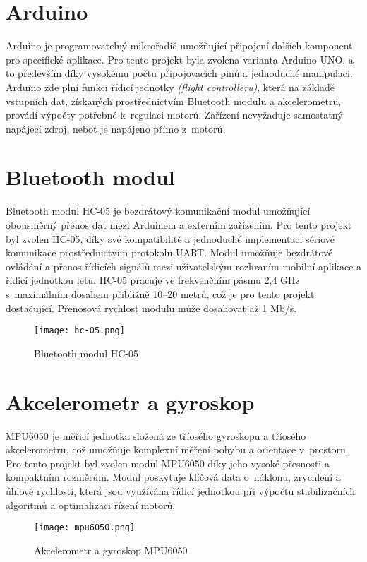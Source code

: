 \documentclass[12pt]{report}
\begin{document}
\section[Arduino]{Arduino}
Arduino je programovatelný mikrořadič umožňující připojení dalších komponent pro specifické aplikace. Pro tento projekt byla zvolena varianta Arduino UNO, a to především díky vysokému počtu připojovacích pinů a jednoduché manipulaci. Arduino zde plní funkci řídicí jednotky \textit{(flight controlleru)}, která na základě vstupních dat, získaných prostřednictvím Bluetooth modulu a akcelerometru, provádí výpočty potřebné k~regulaci motorů. Zařízení nevyžaduje samostatný napájecí zdroj, neboť je napájeno přímo z~motorů.

\section[Bluetooth modul]{Bluetooth modul}
Bluetooth modul HC-05 je bezdrátový komunikační modul umožňující obousměrný přenos dat mezi Arduinem a externím zařízením. Pro tento projekt byl zvolen HC-05, díky své kompatibilitě a jednoduché implementaci sériové komunikace prostřednictvím protokolu UART. Modul umožňuje bezdrátové ovládání a přenos řídicích signálů mezi uživatelským rozhraním mobilní aplikace a řídicí jednotkou letu. HC-05 pracuje ve frekvenčním pásmu 2,4 GHz s~maximálním dosahem přibližně 10–20 metrů, což je pro tento projekt dostačující. Přenosová rychlost modulu může dosahovat až 1 Mb/s. 

\begin{figure}[H]
	\centering
	\texttt{[image: hc-05.png]}
	\caption{Bluetooth modul HC-05}
	\label{fig:hc-05.png}
\end{figure}

\section[Akcelerometr a gyroskop]{Akcelerometr a gyroskop}
MPU6050 je měřicí jednotka složená ze tříosého gyroskopu a tříosého akcelerometru, což umožňuje komplexní měření pohybu a orientace v~prostoru. Pro tento projekt byl zvolen modul MPU6050 díky jeho vysoké přesnosti a kompaktním rozměrům. Modul poskytuje klíčová data o~náklonu, zrychlení a úhlové rychlosti, která jsou využívána řídicí jednotkou při výpočtu stabilizačních algoritmů a optimalizaci řízení motorů.

\begin{figure}[H]
	\centering
	\texttt{[image: mpu6050.png]}
	\caption{Akcelerometr a gyroskop MPU6050}
	\label{fig:hc-05.png}
\end{figure}
\end{document}
